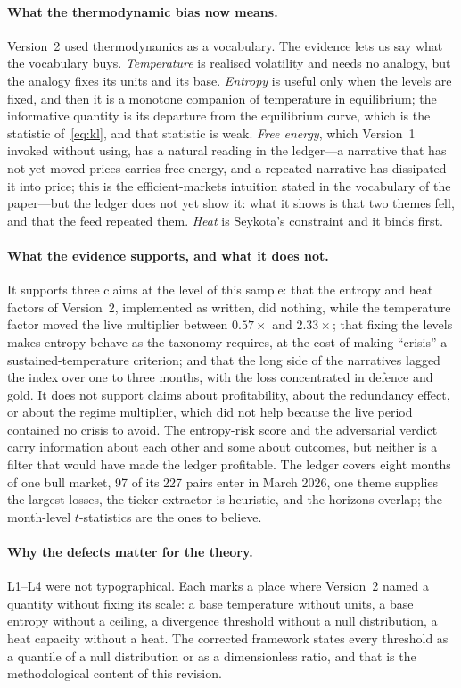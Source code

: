\documentclass[11pt]{article}
\begin{document}
\paragraph{What the thermodynamic bias now means.}
Version~2 used thermodynamics as a vocabulary. The evidence lets us say what the vocabulary buys. \emph{Temperature} is realised volatility and needs no analogy, but the analogy fixes its units and its base. \emph{Entropy} is useful only when the levels are fixed, and then it is a monotone companion of temperature in equilibrium; the informative quantity is its departure from the equilibrium curve, which is the statistic of~\eqref{eq:kl}, and that statistic is weak. \emph{Free energy}, which Version~1 invoked without using, has a natural reading in the ledger---a narrative that has not yet moved prices carries free energy, and a repeated narrative has dissipated it into price; this is the efficient-markets intuition \citep{fama1970} stated in the vocabulary of the paper---but the ledger does not yet show it: what it shows is that two themes fell, and that the feed repeated them. \emph{Heat} is Seykota's constraint and it binds first.

\paragraph{What the evidence supports, and what it does not.}
It supports three claims at the level of this sample: that the entropy and heat factors of Version~2, implemented as written, did nothing, while the temperature factor moved the live multiplier between $0.57\times$ and $2.33\times$; that fixing the levels makes entropy behave as the taxonomy requires, at the cost of making ``crisis'' a sustained-temperature criterion; and that the long side of the narratives lagged the index over one to three months, with the loss concentrated in defence and gold. It does not support claims about profitability, about the redundancy effect, or about the regime multiplier, which did not help because the live period contained no crisis to avoid. The entropy-risk score and the adversarial verdict carry information about each other and some about outcomes, but neither is a filter that would have made the ledger profitable. The ledger covers eight months of one bull market, 97 of its 227 pairs enter in March 2026, one theme supplies the largest losses, the ticker extractor is heuristic, and the horizons overlap; the month-level $t$-statistics are the ones to believe.

\paragraph{Why the defects matter for the theory.}
L1--L4 were not typographical. Each marks a place where Version~2 named a quantity without fixing its scale: a base temperature without units, a base entropy without a ceiling, a divergence threshold without a null distribution, a heat capacity without a heat. The corrected framework states every threshold as a quantile of a null distribution or as a dimensionless ratio, and that is the methodological content of this revision.
\end{document}
